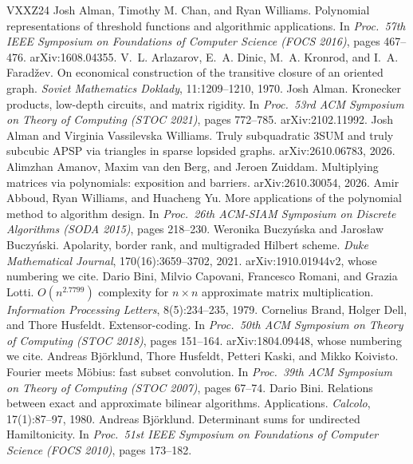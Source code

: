 \documentclass[11pt]{article}
\theoremstyle{definition}
\theoremstyle{remark}
\begin{document}
\begin{thebibliography}{VXXZ24}\setlength{\itemsep}{0pt}\small
{} Josh Alman, Timothy M. Chan, and Ryan Williams. Polynomial representations of threshold functions and algorithmic applications. In \emph{Proc.\ 57th IEEE Symposium on Foundations of Computer Science (FOCS 2016)}, pages 467--476. arXiv:1608.04355.
 V.~L. Arlazarov, E.~A. Dinic, M.~A. Kronrod, and I.~A. Farad\v{z}ev. On economical construction of the transitive closure of an oriented graph. \emph{Soviet Mathematics Doklady}, 11:1209--1210, 1970.
 Josh Alman. Kronecker products, low-depth circuits, and matrix rigidity. In \emph{Proc.\ 53rd ACM Symposium on Theory of Computing (STOC 2021)}, pages 772--785. arXiv:2102.11992.
 Josh Alman and Virginia Vassilevska Williams. Truly subquadratic 3SUM and truly subcubic APSP via triangles in sparse lopsided graphs. arXiv:2610.06783, 2026.
 Alimzhan Amanov, Maxim van den Berg, and Jeroen Zuiddam. Multiplying matrices via polynomials: exposition and barriers. arXiv:2610.30054, 2026.
 Amir Abboud, Ryan Williams, and Huacheng Yu. More applications of the polynomial method to algorithm design. In \emph{Proc.\ 26th ACM-SIAM Symposium on Discrete Algorithms (SODA 2015)}, pages 218--230.
 Weronika Buczy\'nska and Jaros\l{}aw Buczy\'nski. Apolarity, border rank, and multigraded Hilbert scheme. \emph{Duke Mathematical Journal}, 170(16):3659--3702, 2021. arXiv:1910.01944v2, whose numbering we cite.
 Dario Bini, Milvio Capovani, Francesco Romani, and Grazia Lotti. $O(n^{2.7799})$ complexity for $n\times n$ approximate matrix multiplication. \emph{Information Processing Letters}, 8(5):234--235, 1979.
 Cornelius Brand, Holger Dell, and Thore Husfeldt. Extensor-coding. In \emph{Proc.\ 50th ACM Symposium on Theory of Computing (STOC 2018)}, pages 151--164. arXiv:1804.09448, whose numbering we cite.
 Andreas Bj\"orklund, Thore Husfeldt, Petteri Kaski, and Mikko Koivisto. Fourier meets M\"obius: fast subset convolution. In \emph{Proc.\ 39th ACM Symposium on Theory of Computing (STOC 2007)}, pages 67--74.
 Dario Bini. Relations between exact and approximate bilinear algorithms. Applications. \emph{Calcolo}, 17(1):87--97, 1980.
 Andreas Bj\"orklund. Determinant sums for undirected Hamiltonicity. In \emph{Proc.\ 51st IEEE Symposium on Foundations of Computer Science (FOCS 2010)}, pages 173--182.

\end{thebibliography}
\end{document}
